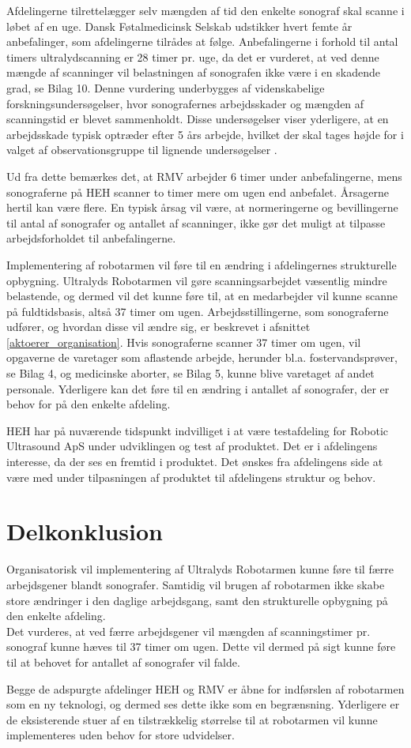 Afdelingerne tilrettelægger selv mængden af tid den enkelte sonograf skal scanne i løbet af en uge. Dansk Føtalmedicinsk Selskab udstikker hvert femte år anbefalinger, som afdelingerne tilrådes at følge. Anbefalingerne i forhold til antal timers ultralydscanning er 28 timer pr. uge, da det er vurderet, at ved denne mængde af scanninger vil belastningen af sonografen ikke være i en skadende grad, se Bilag 10. Denne vurdering underbygges af videnskabelige forskningsundersøgelser, hvor sonografernes arbejdsskader og mængden af scanningstid er blevet sammenholdt. Disse undersøgelser viser yderligere, at en arbejdsskade typisk optræder efter 5 års arbejde, hvilket der skal tages højde for i valget af observationsgruppe til lignende undersøgelser \cite{35}.

Ud fra dette bemærkes det, at RMV arbejder 6 timer under anbefalingerne, mens sonograferne på HEH scanner to timer mere om ugen end anbefalet. Årsagerne hertil kan være flere. En typisk årsag vil være, at normeringerne og bevillingerne til antal af sonografer og antallet af scanninger, ikke gør det muligt at tilpasse arbejdsforholdet til anbefalingerne. 

Implementering af robotarmen vil føre til en ændring i afdelingernes strukturelle opbygning. Ultralyds Robotarmen vil gøre scanningsarbejdet væsentlig mindre belastende, og dermed vil det kunne føre til, at en medarbejder vil kunne scanne på fuldtidsbasis, altså 37 timer om ugen. Arbejdsstillingerne, som sonograferne udfører, og hvordan disse vil ændre sig, er beskrevet i afsnittet \ref{aktoerer_organisation}. Hvis sonograferne scanner 37 timer om ugen, vil opgaverne de varetager som aflastende arbejde, herunder bl.a. fostervandsprøver, se Bilag 4, og medicinske aborter, se Bilag 5, kunne blive varetaget af andet personale. Yderligere kan det føre til en ændring i antallet af sonografer, der er behov for på den enkelte afdeling. 

HEH har på nuværende tidspunkt indvilliget i at være testafdeling for Robotic Ultrasound ApS under udviklingen og test af produktet. Det er i afdelingens interesse, da der ses en fremtid i produktet. Det ønskes fra afdelingens side at være med under tilpasningen af produktet til afdelingens struktur og behov. 

\section{Delkonklusion}
Organisatorisk vil implementering af Ultralyds Robotarmen kunne føre til færre arbejdsgener blandt sonografer. Samtidig vil brugen af robotarmen ikke skabe store ændringer i den daglige arbejdsgang, samt den strukturelle opbygning på den enkelte afdeling. \\
Det vurderes, at ved færre arbejdsgener vil mængden af scanningstimer pr. sonograf kunne hæves til 37 timer om ugen. Dette vil dermed på sigt kunne føre til at behovet for antallet af sonografer vil falde.

Begge de adspurgte afdelinger HEH og RMV er åbne for indførslen af robotarmen som en ny teknologi, og dermed ses dette ikke som en begrænsning. Yderligere er de eksisterende stuer af en tilstrækkelig størrelse til at robotarmen vil kunne implementeres uden behov for store udvidelser. 